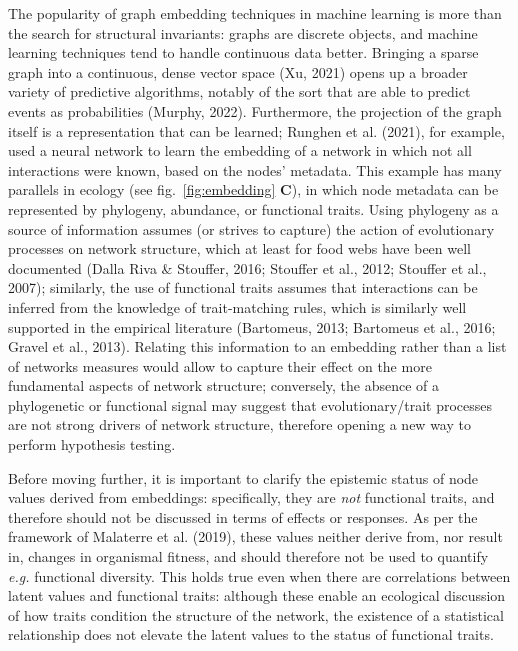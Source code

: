 \documentclass[11pt]{article}
\begin{document}
The popularity of graph embedding techniques in machine learning is more
than the search for structural invariants: graphs are discrete objects,
and machine learning techniques tend to handle continuous data better.
Bringing a sparse graph into a continuous, dense vector space (Xu, 2021)
opens up a broader variety of predictive algorithms, notably of the sort
that are able to predict events as probabilities (Murphy, 2022).
Furthermore, the projection of the graph itself is a representation that
can be learned; Runghen et al. (2021), for example, used a neural
network to learn the embedding of a network in which not all
interactions were known, based on the nodes' metadata. This example has
many parallels in ecology (see fig.~\ref{fig:embedding} \textbf{C}), in
which node metadata can be represented by phylogeny, abundance, or
functional traits. Using phylogeny as a source of information assumes
(or strives to capture) the action of evolutionary processes on network
structure, which at least for food webs have been well documented (Dalla
Riva \& Stouffer, 2016; Stouffer et al., 2012; Stouffer et al., 2007);
similarly, the use of functional traits assumes that interactions can be
inferred from the knowledge of trait-matching rules, which is similarly
well supported in the empirical literature (Bartomeus, 2013; Bartomeus
et al., 2016; Gravel et al., 2013). Relating this information to an
embedding rather than a list of networks measures would allow to capture
their effect on the more fundamental aspects of network structure;
conversely, the absence of a phylogenetic or functional signal may
suggest that evolutionary/trait processes are not strong drivers of
network structure, therefore opening a new way to perform hypothesis
testing.

Before moving further, it is important to clarify the epistemic status
of node values derived from embeddings: specifically, they are
\emph{not} functional traits, and therefore should not be discussed in
terms of effects or responses. As per the framework of Malaterre et al.
(2019), these values neither derive from, nor result in, changes in
organismal fitness, and should therefore not be used to quantify
\emph{e.g.} functional diversity. This holds true even when there are
correlations between latent values and functional traits: although these
enable an ecological discussion of how traits condition the structure of
the network, the existence of a statistical relationship does not
elevate the latent values to the status of functional traits.
\end{document}
